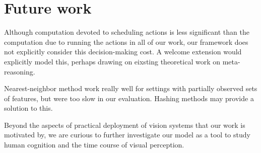 \section{Future work}

Although computation devoted to scheduling actions is less significant than the computation due to running the actions in all of our work, our framework does not explicitly consider this decision-making cost.
A welcome extension would explicitly model this, perhaps drawing on eixsting theoretical work on meta-reasoning.

Nearest-neighbor method work really well for settings with partially observed sets of features, but were too slow in our evaluation.
Hashing methods may provide a solution to this.

Beyond the aspects of practical deployment of vision systems that our work is motivated by, we are curious to further investigate our model as a tool to study human cognition and the time course of visual perception.
